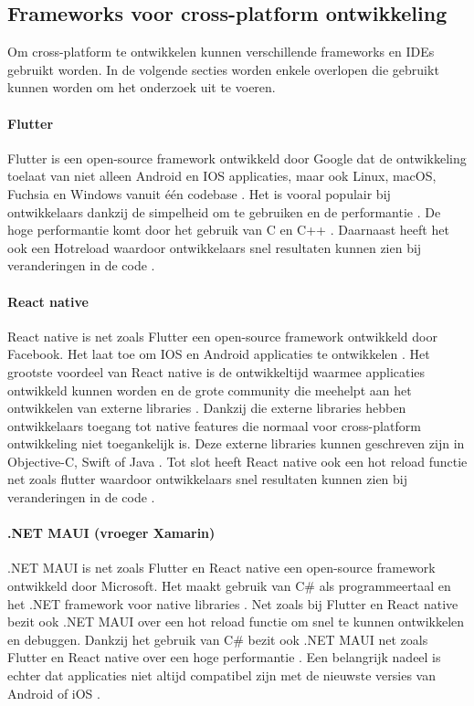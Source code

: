 \subsection{Frameworks voor cross-platform ontwikkeling}
Om cross-platform te ontwikkelen kunnen verschillende frameworks en 
IDEs gebruikt worden. In de volgende secties worden enkele overlopen die gebruikt kunnen worden  
om het onderzoek uit te voeren.

\paragraph{Flutter}
Flutter is een open-source framework ontwikkeld door Google dat de ontwikkeling toelaat 
van niet alleen Android en IOS applicaties, maar ook Linux, macOS, Fuchsia en Windows 
vanuit één codebase \autocite{Okeke2022a}. Het is vooral populair bij ontwikkelaars 
dankzij de simpelheid om te gebruiken en de performantie \autocite{Sakovich22023}. De 
hoge performantie komt door het gebruik van C en C++ \autocite{Terekhov2022}. Daarnaast 
heeft het ook een \gls{Hotreload} waardoor ontwikkelaars snel resultaten kunnen zien bij 
veranderingen in de code \autocite{Sakovich22023}.

\paragraph{React native}
React native is net zoals Flutter een open-source framework ontwikkeld door Facebook. 
Het laat toe om IOS en Android applicaties te ontwikkelen \autocite{Terekhov2022}. 
Het grootste voordeel van React native is de ontwikkeltijd waarmee applicaties ontwikkeld 
kunnen worden \autocite{Terekhov2022} en de grote community die meehelpt aan het ontwikkelen 
van externe libraries \autocite{Okeke2022a}. Dankzij die externe libraries hebben ontwikkelaars 
toegang tot native features die normaal voor cross-platform ontwikkeling niet toegankelijk is. 
Deze externe libraries kunnen geschreven zijn in Objective-C, Swift of Java \autocite{Okeke2022a}. 
Tot slot heeft React native ook een hot reload functie net zoals flutter waardoor ontwikkelaars 
snel resultaten kunnen zien bij veranderingen in de code \autocite{Terekhov2022}.

\paragraph{.NET MAUI (vroeger Xamarin)}
.NET MAUI is net zoals Flutter en React native een open-source framework ontwikkeld door 
Microsoft. Het maakt gebruik van C\# als programmeertaal en het .NET framework voor 
native libraries \autocite{Sakovich22023}. Net zoals bij Flutter en React native bezit 
ook .NET MAUI over een hot reload functie om snel te kunnen ontwikkelen en debuggen. 
Dankzij het gebruik van C\# bezit ook .NET MAUI net zoals Flutter en React native over 
een hoge performantie \autocite{Okeke2022a}. Een belangrijk nadeel is echter dat 
applicaties niet altijd compatibel zijn met de nieuwste versies van 
Android of iOS \autocite{Terekhov2022}.

